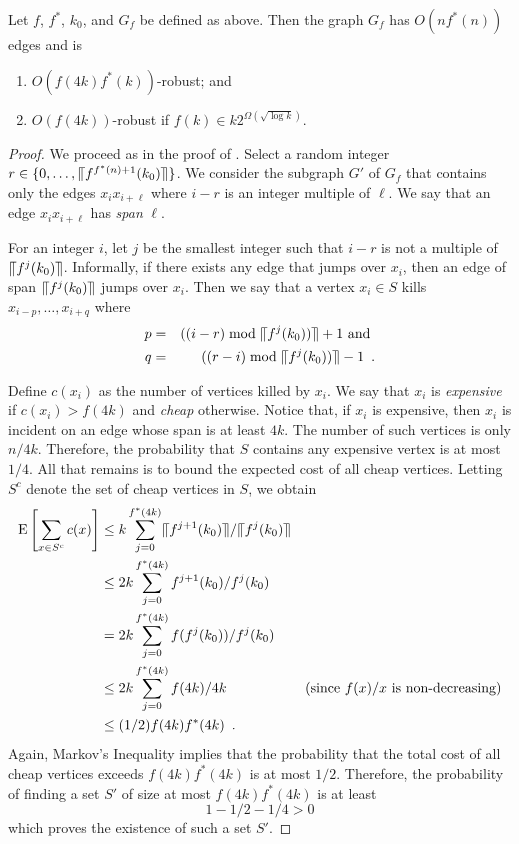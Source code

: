 \documentclass{patmorin}
\begin{document}
\begin{thm}
  Let $f$, $f^*$, $k_0$, and $G_f$ be defined as above.  Then the graph
  $G_f$ has $O(nf^*(n))$ edges and is
  \begin{enumerate}
    \item $O(f(4k)f^*(k))$-robust; and 
    \item $O(f(4k))$-robust if $f(k)\in k2^{\Omega(\sqrt{\log k})}$.
  \end{enumerate}
\end{thm}

\begin{proof}
  We proceed as in the proof of .  Select a random
  integer $r\in\{0,\ldots,\llceil f^{f^*(n)+1}(k_0)\rrceil\}$.  We consider the
  subgraph $G'$ of $G_f$ that contains only the edges $x_ix_{i+\ell}$
  where $i-r$ is an integer multiple of $\ell$.  We say that an edge
  $x_ix_{i+\ell}$ has \emph{span} $\ell$.

  For an integer $i$, let $j$ be the smallest integer such that $i-r$ is
  not a multiple of $\llceil f^j(k_0)\rrceil$.  Informally, if there exists any
  edge that jumps over $x_i$, then an edge of span $\llceil f^j(k_0)\rrceil$
  jumps over $x_i$.  Then we say that a vertex $x_i\in S$ kills
  $x_{i-p},\ldots,x_{i+q}$ where
  \begin{eqnarray*}
     p&=& ((i-r) \bmod \llceil f^j(k_0))\rrceil+1 \text{ and } \\
     q&=& ((r-i) \bmod \llceil f^j(k_0))\rrceil-1 \enspace .
  \end{eqnarray*}
  
  Define $c(x_i)$ as the number of vertices killed by $x_i$.  We say
  that $x_i$ is \emph{expensive} if $c(x_i) > f(4k)$ and \emph{cheap}
  otherwise.  Notice that, if $x_i$ is expensive, then $x_i$ is incident
  on an edge whose span is at least $4k$.  The number of such vertices
  is only $n/4k$.  Therefore, the probability that $S$ contains any
  expensive vertex is at most $1/4$.  All that remains is to bound the
  expected cost of all cheap vertices. Letting $S^c$ denote the set of
  cheap vertices in $S$, we obtain
  \begin{align*}
     \mathrm{E}\left[\sum_{x\in S^c} c(x)\right] 
      & \le  k \sum_{j=0}^{f^*(4k)} \llceil f^{j+1}(k_0)\rrceil/\llceil f^j(k_0)\rrceil \\
      & \le  2k \sum_{j=0}^{f^*(4k)} f^{j+1}(k_0)/f^j(k_0) \\
      & =  2k \sum_{j=0}^{f^*(4k)} f(f^{j}(k_0))/f^j(k_0) \\
      & \le  2k \sum_{j=0}^{f^*(4k)} f(4k)/4k 
           & \text{(since $f(x)/x$ is non-decreasing)} \\
      & \le  (1/2)f(4k)f^*(4k) \enspace .
  \end{align*}
  Again, Markov's Inequality implies that the probability that the total
  cost of all cheap vertices exceeds $f(4k)f^*(4k)$ is at most $1/2$.
  Therefore, the probability of finding a set $S'$ of size at most
  $f(4k)f^*(4k)$ is at least
  \[  
     1 - 1/2 - 1/4 > 0 
  \]
  which proves the existence of such a set $S'$.
  

\end{proof}
\end{document}
